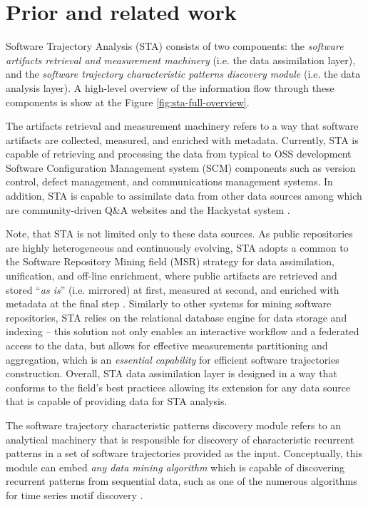 \chapter{Prior and related work}\label{chapter_background_work}
Software Trajectory Analysis (STA) consists of two components: 
the \textit{software artifacts retrieval and measurement machinery} (i.e. the data assimilation layer), 
and the \textit{software trajectory characteristic patterns discovery module} (i.e. the data analysis layer). 
A high-level overview of the information flow through these components is show at the Figure \ref{fig:sta-full-overview}.

The artifacts retrieval and measurement machinery refers to a way that software artifacts are collected, 
measured, and enriched with metadata. 
Currently, STA is capable of retrieving and processing the data from typical to OSS development Software 
Configuration Management system (SCM) components such as version control, 
defect management, and communications management systems. 
In addition, STA is capable to assimilate data from other data sources among which are community-driven 
Q\&A websites and the Hackystat system \cite{csdl2-10-09}.

Note, that STA is not limited only to these data sources.
As public repositories are highly heterogeneous and continuously evolving, STA adopts a common to the 
Software Repository Mining field (MSR) strategy for data assimilation, unification, and off-line enrichment,
where public artifacts are retrieved and stored ``\textit{as is}'' (i.e. mirrored) at first, 
measured at second, and enriched with metadata at the final step 
\cite{citeulike:12550438} \cite{german04_softchange} \cite{cvsanaly}.
Similarly to other systems for mining software repositories, STA relies on the relational database engine 
for data storage and indexing -- this solution not only enables an interactive workflow and a federated 
access to the data, but allows for effective measurements partitioning and aggregation, which is 
an \textit{essential capability} for efficient software trajectories construction.
Overall, STA data assimilation layer is designed in a way that conforms to the field's best practices
allowing its extension for any data source that is capable of providing data for STA analysis.

The software trajectory characteristic patterns discovery module refers to an analytical machinery that 
is responsible for discovery of characteristic recurrent patterns in a set of software trajectories provided as 
the input. Conceptually, this module can embed \textit{any data mining algorithm} which is capable of 
discovering recurrent patterns from sequential data, such as one of the numerous algorithms for time series 
motif discovery \cite{citeulike:13197378}.

